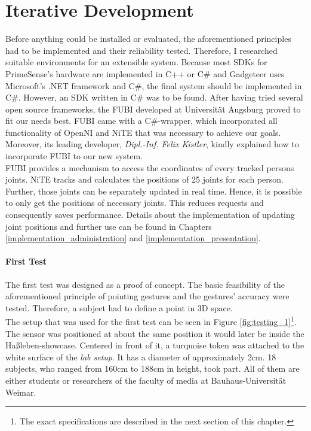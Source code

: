 \section{Iterative Development}
\label{installation_testing}

Before anything could be installed or evaluated, the aforementioned principles had to be implemented and their reliability tested. Therefore, I researched suitable environments for an extensible system. Because most \ac{SDK}s for PrimeSense's hardware are implemented in C++ or C$\#$ and Gadgeteer uses Microsoft's .NET framework and C$\#$, the final system should be implemented in C$\#$. However, an \ac{SDK} written in C$\#$ was to be found. After having tried several open source frameworks, the \ac{FUBI} developed at Universität Augsburg proved to fit our needs best. \ac{FUBI} came with a C$\#$-wrapper, which incorporated all functionality of OpenNI and NiTE that was necessary to achieve our goals. Moreover, its leading developer, \textit{Dipl.-Inf. Felix Kistler}, kindly explained how to incorporate \ac{FUBI} to our new system. 
\\
\ac{FUBI} provides a mechanism to access the coordinates of every tracked persons joints. NiTE tracks and calculates the positions of 25 joints for each person. Further, those joints can be separately updated in real time. Hence, it is possible to only get the positions of necessary joints. This reduces requests and consequently saves performance. Details about the implementation of updating joint positions and further use can be found in Chapters \ref{implementation_administration} and \ref{implementation_presentation}.

\paragraph{First Test} The first test was designed as a proof of concept. The basic feasibility of the aforementioned principle of pointing gestures and the gestures' accuracy were tested. Therefore, a subject had to define a point in \ac{3D} space.
\\ 
The setup that was used for the first test can be seen in Figure \ref{fig:testing_1}\footnote{The exact specifications are described in the next section of this chapter.}. The sensor was positioned at about the same position it would later be inside the Haßleben-showcase. Centered in front of it, a turquoise token was attached to the white surface of the \textit{lab setup}. It has a diameter of approximately 2cm. 18 subjects, who ranged from 160cm to 188cm in height, took part. All of them are either students or researchers of the faculty of media at Bauhaus-Universität Weimar.

